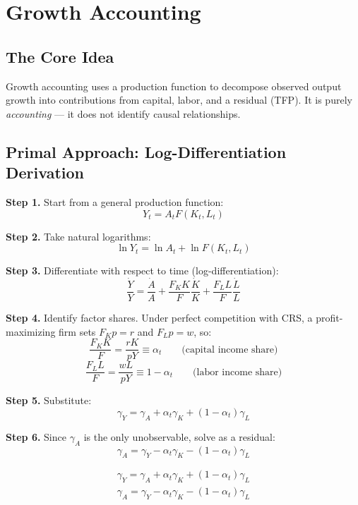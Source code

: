 \documentclass[a4paper,11pt]{article}
\newcommand{\gA}{\gamma_{A}}
\newcommand{\gY}{\gamma_{Y}}
\newcommand{\gK}{\gamma_{K}}
\newcommand{\gL}{\gamma_{L}}
\begin{document}
\clearpage

\section{Growth Accounting}

\subsection*{The Core Idea}
Growth accounting uses a production function to decompose observed output growth into contributions from capital, labor, and a residual (TFP). It is purely \textit{accounting} --- it does not identify causal relationships.

\subsection*{Primal Approach: Log-Differentiation Derivation}

\begin{derivationbox}[title={Derivation: Solow Residual}]
\textbf{Step 1.} Start from a general production function:
\[
Y_t = A_t F(K_t, L_t)
\]

\textbf{Step 2.} Take natural logarithms:
\[
\ln Y_t = \ln A_t + \ln F(K_t, L_t)
\]

\textbf{Step 3.} Differentiate with respect to time (log-differentiation):
\[
\frac{\dot{Y}}{Y} = \frac{\dot{A}}{A} + \frac{F_K K}{F}\frac{\dot{K}}{K} + \frac{F_L L}{F}\frac{\dot{L}}{L}
\]

\textbf{Step 4.} Identify factor shares. Under perfect competition with CRS, a profit-maximizing firm sets $F_K p = r$ and $F_L p = w$, so:
\[
\frac{F_K K}{F} = \frac{rK}{pY} \equiv \alpha_t \qquad \text{(capital income share)}
\]
\[
\frac{F_L L}{F} = \frac{wL}{pY} \equiv 1-\alpha_t \qquad \text{(labor income share)}
\]

\textbf{Step 5.} Substitute:
\[
\gY = \gA + \alpha_t \gK + (1-\alpha_t)\gL
\]

\textbf{Step 6.} Since $\gA$ is the only unobservable, solve as a residual:
\[
\gA = \gY - \alpha_t \gK - (1-\alpha_t)\gL
\]
\end{derivationbox}

\begin{resultbox}
\begin{align*}
\boxed{\gY = \gA + \alpha_t \gK + (1-\alpha_t)\gL}
\tag{Growth Decomposition}
\end{align*}
\begin{align*}
\boxed{\gA = \gY - \alpha_t \gK - (1-\alpha_t)\gL}
\tag{Solow Residual}
\end{align*}
\end{resultbox}
\end{document}
